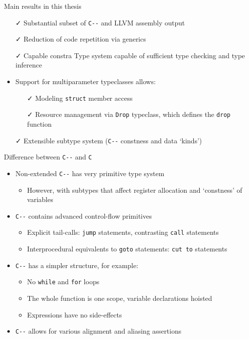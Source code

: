 \documentclass[aspectratio=169]{beamer}
\newcommand{\li}[1]{\lstinline{#1}}
\def\cmm{\texttt{C-\relax-}}
\begin{document}
\begin{frame}{Main results in this thesis}
  \begin{itemize}
  \item[\color{green!80!black}\faCheck] Substantial subset of \cmm{} and LLVM assembly output
  \item[\color{green!80!black}\faCheck] Reduction of code repetition via generics
  \item[\color{green!80!black}\faCheck] Capable constra Type system capable of sufficient type checking and type inference
  \item Support for multiparameter typeclasses allows:
    \begin{itemize}
      \item[\color{green!80!black}\faCheck] Modeling \li{struct} member access
      \item[\color{green!80!black}\faCheck] Resource management via \li{Drop} typeclass, which defines the \li{drop} function
    \end{itemize}
  \item[\color{green!80!black}\faCheck] Extensible subtype system (\cmm{} constness and data `kinds')
  \end{itemize}
\end{frame}


\begin{frame}{Difference between \cmm{} and \texttt{C}}
  \begin{itemize}
    \item Non-extended \cmm{} has very primitive type system
    \begin{itemize}
      \item However, with subtypes that affect register allocation and `constness' of variables
    \end{itemize} 
    \item \cmm{} contains advanced control-flow primitives
    \begin{itemize}
      \item Explicit tail-calls: \li{jump} statements, contrasting \li{call} statements
      \item Interprocedural equivalents to \li{goto} statements: \li{cut to} statements
    \end{itemize}
    \item \cmm{} has a simpler structure, for example:
    \begin{itemize}
      \item No \li{while} and \li{for} loops
      \item The whole function is one scope, variable declarations hoisted
      \item Expressions have no side-effects
    \end{itemize}
    \item \cmm{} allows for various alignment and aliasing assertions
  \end{itemize}
\end{frame}
\end{document}
